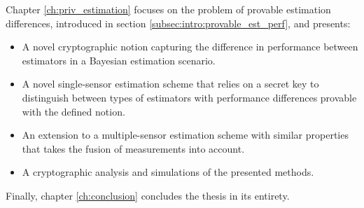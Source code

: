 Chapter \ref{ch:priv_estimation} focuses on the problem of provable estimation differences, introduced in section \ref{subsec:intro:provable_est_perf}, and presents:
\begin{itemize}
    \item A novel cryptographic notion capturing the difference in performance between estimators in a Bayesian estimation scenario.
    \item A novel single-sensor estimation scheme that relies on a secret key to distinguish between types of estimators with performance differences provable with the defined notion.
    \item An extension to a multiple-sensor estimation scheme with similar properties that takes the fusion of measurements into account.
    \item A cryptographic analysis and simulations of the presented methods.
\end{itemize}

Finally, chapter \ref{ch:conclusion} concludes the thesis in its entirety.